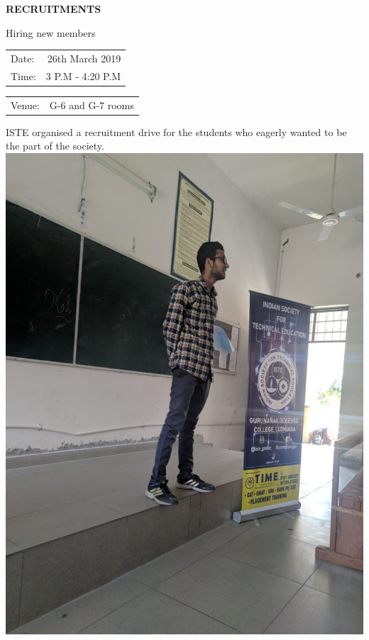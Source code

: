 \documentclass[12pt, a4 paper]{article}
\begin{document}
\begin{center}
\Huge \bfseries \ttfamily RECRUITMENTS
\end{center}

\begin{center}
\large Hiring new members
\end{center}

\begin{center}
\begin{multicols}{2}
\begin{tabular}{l r}
Date: & 26th March 2019 \\ %
Time: & 3 P.M - 4:20 P.M \\ %
\end{tabular}
\columnbreak
\begin{tabular}{l r}
Venue: & G-6 and G-7 rooms \\ %
\end{tabular}
\end{multicols}

\begin{Large}
\begin{multicols}{2}
ISTE organised a recruitment drive for the students who eagerly wanted to be the part of the society.
\columnbreak
\includegraphics[width=\linewidth]{image2.jpg}
\end{multicols}


\end{Large}
\end{center}
\end{document}
